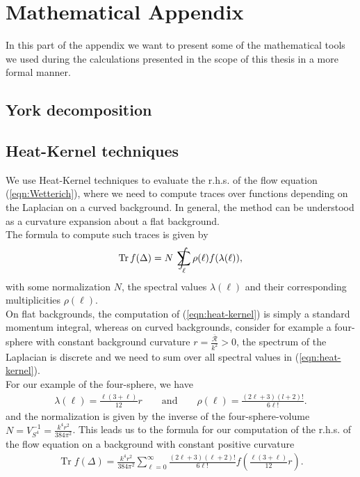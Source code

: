 \chapter{Mathematical Appendix}
In this part of the appendix we want to present some of the mathematical tools we used during the calculations presented in the scope of this thesis in a more formal manner.

\section{York decomposition}
\blindtext

\section{Heat-Kernel techniques}
We use Heat-Kernel techniques to evaluate the r.h.s. of the flow equation (\ref{eqn:Wetterich}), where we need to compute traces over functions depending on the Laplacian on a curved background. In general, the method can be understood as a curvature expansion about a flat background. \\
The formula to compute such traces is given by
\begin{align}
	\operatorname{Tr} f(\Delta)= N \  \int\kern-1.3em\sum_{\ell} \rho(\ell) f(\lambda(\ell)),
	\label{eqn:heat-kernel}
\end{align}
with some normalization $N$, the spectral values $\lambda(\ell)$ and their corresponding multiplicities $\rho(\ell)$. \\
On flat backgrounds, the computation of (\ref{eqn:heat-kernel}) is simply a standard momentum integral, whereas on curved backgrounds, consider for example a four-sphere with constant background curvature $r = \frac{\overline{\mathcal{R}}}{k^2} > 0$, the spectrum of the Laplacian is discrete and we need to sum over all spectral values in (\ref{eqn:heat-kernel}). \\
For our example of the four-sphere, we have
\begin{align}
	\lambda(\ell) = \frac{\ell(3+\ell)}{12}r \qquad \text{and} \qquad \rho(\ell) = \frac{(2\ell + 3)(l+2)!}{6\ell!}.
\end{align}
and the normalization is given by the inverse of the four-sphere-volume $N= V_{S^4}^{-1} = \frac{k^4r^2}{384\pi^2}$. This leads us to the formula for our computation of the r.h.s. of the flow equation on a background with constant positive curvature
\begin{align}
\operatorname{Tr} f(\Delta)=\frac{k^{4} r^{2}}{384 \pi^{2}} \sum_{\ell=0}^{\infty} \frac{(2 \ell+3)(\ell+2) !}{6 \ell !} f\left(\frac{\ell(3+\ell)}{12} r\right)	.
\end{align}
